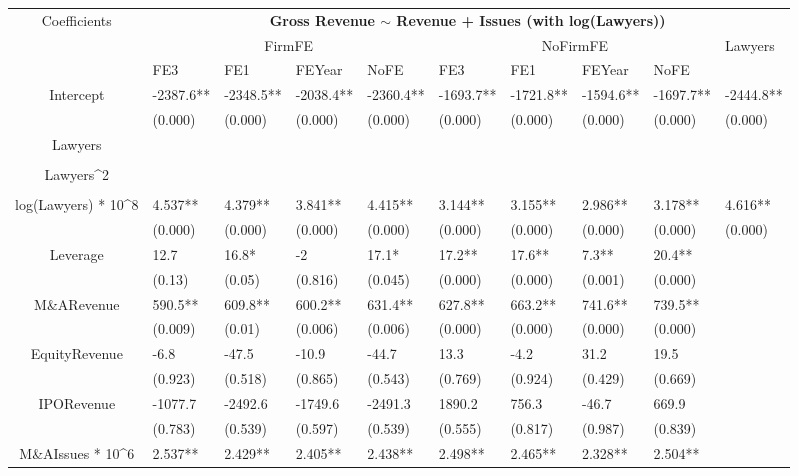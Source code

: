 \documentclass{article}
\begin{document}
\begin{table}[H]
\centering
\begin{tabular}{|clllllllll|}
\hline
\multirow{3}{*}{Coefficients} & \multicolumn{9}{c|}{\textbf{Gross Revenue $\sim$ Revenue + Issues (with log(Lawyers))}} \\
\cline{2-10}
& \multicolumn{4}{c}{FirmFE} & \multicolumn{4}{c}{NoFirmFE} & \multirow{2}{*}{Lawyers} \\
\cline{2-9}
& FE3 & FE1 & FEYear & NoFE & FE3 & FE1 & FEYear & NoFE &  \\
\hline
 
Intercept & -2387.6** & -2348.5** & -2038.4** & -2360.4** & -1693.7** & -1721.8** & -1594.6** & -1697.7** & -2444.8** \\ 
   & (0.000) & (0.000) & (0.000) & (0.000) & (0.000) & (0.000) & (0.000) & (0.000) & (0.000) \\ 
  Lawyers &  &  &  &  &  &  &  &  &  \\ 
   &  &  &  &  &  &  &  &  &  \\ 
  Lawyers^2 &  &  &  &  &  &  &  &  &  \\ 
   &  &  &  &  &  &  &  &  &  \\ 
  log(Lawyers) * 10^8 & 4.537** & 4.379** & 3.841** & 4.415** & 3.144** & 3.155** & 2.986** & 3.178** & 4.616** \\ 
   & (0.000) & (0.000) & (0.000) & (0.000) & (0.000) & (0.000) & (0.000) & (0.000) & (0.000) \\ 
  Leverage & 12.7 & 16.8* & -2 & 17.1* & 17.2** & 17.6** & 7.3** & 20.4** &  \\ 
   & (0.13) & (0.05) & (0.816) & (0.045) & (0.000) & (0.000) & (0.001) & (0.000) &  \\ 
  M\&ARevenue & 590.5** & 609.8** & 600.2** & 631.4** & 627.8** & 663.2** & 741.6** & 739.5** &  \\ 
   & (0.009) & (0.01) & (0.006) & (0.006) & (0.000) & (0.000) & (0.000) & (0.000) &  \\ 
  EquityRevenue & -6.8 & -47.5 & -10.9 & -44.7 & 13.3 & -4.2 & 31.2 & 19.5 &  \\ 
   & (0.923) & (0.518) & (0.865) & (0.543) & (0.769) & (0.924) & (0.429) & (0.669) &  \\ 
  IPORevenue & -1077.7 & -2492.6 & -1749.6 & -2491.3 & 1890.2 & 756.3 & -46.7 & 669.9 &  \\ 
   & (0.783) & (0.539) & (0.597) & (0.539) & (0.555) & (0.817) & (0.987) & (0.839) &  \\ 
  M\&AIssues * 10^6 & 2.537** & 2.429** & 2.405** & 2.438** & 2.498** & 2.465** & 2.328** & 2.504** &  \\ 

\end{tabular}
\end{table}
\end{document}
